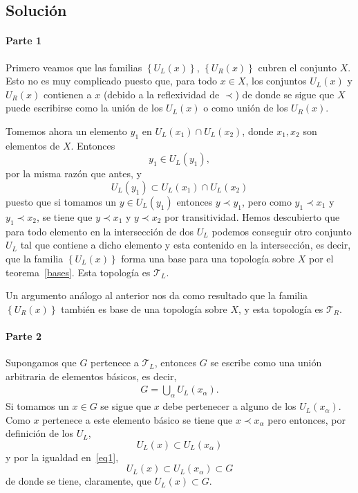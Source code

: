 \documentclass[fleqn,leqno,11pt,letterpaper,final]{article}
\begin{document}
\subsection{Solución}

\paragraph{Parte 1}%

Primero veamos que las familias $\left\{ U_L(x) \right\}$, $\left\{ U_R(x) \right\}$
cubren el conjunto $X$. Esto no es muy complicado puesto que, para todo $x\in X$,
los conjuntos $ U_L(x) $ y $ U_R(x) $ contienen a $x$ 
(debido a la reflexividad de $\prec$) de donde se sigue que $X$ puede escribirse
como la unión de los $U_L(x)$ o como unión de los $U_R(x)$.

Tomemos ahora un elemento $y_1$ en $U_L(x_1)\cap U_L(x_2)$, donde
$x_1,x_2$ son elementos de $X$. Entonces
\[
y_1\in U_L(y_1),
\]
por la misma razón que antes, y
\[
U_L(y_1)\subset U_L(x_1)\cap U_L(x_2)
\]
puesto que si tomamos un $y\in U_L(y_1)$ entonces $y\prec y_1$, pero como
$y_1\prec x_1$ y $y_1\prec x_2$, se tiene que $y\prec x_1$ y $y\prec x_2$ por
transitividad. Hemos descubierto que para todo elemento en la intersección de dos $U_L$
podemos conseguir otro conjunto $U_L$ tal que contiene a dicho elemento y esta contenido en la
intersección, es decir, que la familia $\left\{ U_L(x) \right\}$ forma una base para una topología
sobre $X$ por el teorema~\ref{bases}. Esta topología es $\mathcal{T}_L$.

Un argumento análogo al anterior nos da como resultado que la familia $\left\{ U_R(x) \right\}$ también es
base de una topología sobre $X$, y esta topología es $\mathcal{T}_R$.

\paragraph{Parte 2}
Supongamos que $G$ pertenece a $\mathcal{T}_L$, entonces $G$ se escribe como una unión arbitraria
de elementos básicos, es decir, 
\begin{align}
G = \bigcup_\alpha U_L(x_\alpha).\label{eq1}
\end{align}
Si tomamos un $x\in G$ se sigue que $x$ debe pertenecer a alguno de los $U_L(x_\alpha)$. Como $x$ pertenece
a este elemento básico se tiene que $x\prec x_\alpha$ pero entonces, por definición de los $U_L$,
\[
U_L(x)\subset U_L(x_\alpha)
\]
y por la igualdad en~\ref{eq1},
\[
U_L(x)\subset U_L(x_\alpha)\subset G
\]
de donde se tiene, claramente, que $U_L(x)\subset G$.
\end{document}

